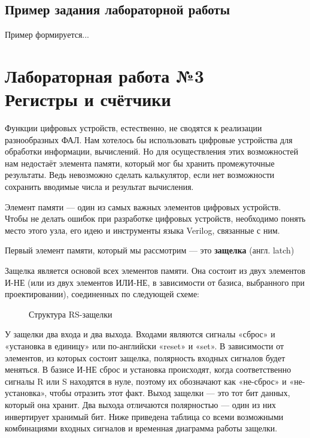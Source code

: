 \documentclass[a5paper, DIV=14, headings=openany, twoside=true,fontsize=10pt, titlepage]{scrreprt}
\newcommand{\quotes}[1]{«#1»}
\newcommand{\eng}[1]{\foreignlanguage{english}{#1}}
\begin{document}
\section*{Пример задания лабораторной работы}
\par{Пример формируется...}


\chapter{Лабораторная работа №3\\Регистры и счётчики} 

\par{Функции цифровых устройств, естественно, не сводятся к реализации разнообразных ФАЛ. Нам хотелось бы использовать цифровые устройства для обработки информации, вычислений. Но для осуществления этих возможностей нам недостаёт элемента памяти, который мог бы хранить промежуточные результаты. Ведь невозможно сделать калькулятор, если нет возможности сохранить вводимые числа и результат вычисления.}

\par{Элемент памяти — один из самых важных элементов цифровых устройств. Чтобы не делать ошибок при разработке цифровых устройств, необходимо понять место этого узла, его идею и инструменты языка \eng{Verilog}, связанные с ним.}

\par{Первый элемент памяти, который мы рассмотрим — это  \textbf{защелка} (англ. \eng{latch})}

\par{Защелка является основой всех элементов памяти. Она состоит из двух элементов И-НЕ (или из двух элементов ИЛИ-НЕ, в зависимости от базиса, выбранного при проектировании), соединенных по следующей схеме:}

\begin{figure}[H]
	\centering
	\def\svgwidth{\columnwidth}
	
	\caption{Структура \eng{RS}-защелки}
\end{figure}

\par{У защелки два входа и два выхода. Входами являются сигналы \quotes{сброс} и \quotes{установка в единицу} или по-английски \quotes{reset} и \quotes{set}. В зависимости от элементов, из которых состоит защелка, полярность входных сигналов будет меняться. В базисе И-НЕ сброс и установка происходят, когда соответственно сигналы \eng{R} или \eng{S} находятся в нуле, поэтому их обозначают как \quotes{не-сброс} и \quotes{не-установка}, чтобы отразить этот факт. Выход защелки — это тот бит данных, который она хранит. Два выхода отличаются полярностью — один из них инвертирует хранимый бит. Ниже приведена таблица со всеми возможными комбинациями входных сигналов и временная диаграмма работы защелки.}
\end{document}

